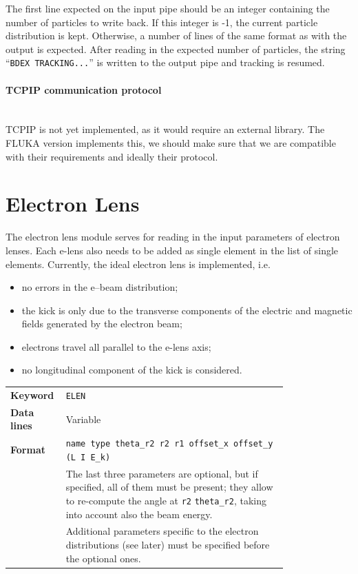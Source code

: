 The first line expected on the input pipe should be an integer containing the number of particles to write back.
If this integer is -1, the current particle distribution is kept.
Otherwise, a number of lines of the same format as with the output is expected.
After reading in the expected number of particles, the string ``\texttt{BDEX TRACKING...}'' is written to the output pipe and tracking is resumed.

\paragraph{TCPIP communication protocol}~\\

TCPIP is not yet implemented, as it would require an external library.
The FLUKA version implements this, we should make sure that we are compatible with their requirements and ideally their protocol.

\section{Electron Lens} \label{sec:elen}

The electron lens module serves for reading in the input parameters of electron lenses.
Each e-lens also needs to be added as single element in the list of single elements.
Currently, the ideal electron lens is implemented, i.e.
\begin{itemize}
\item no errors in the e--beam distribution;
\item the kick is only due to the transverse components of the electric and
  magnetic fields generated by the electron beam;
\item electrons travel all parallel to the e-lens axis;
\item no longitudinal component of the kick is considered.
\end{itemize}

\bigskip
\begin{tabular}{@{}lp{0.8\linewidth}}
    \textbf{Keyword}    & \texttt{ELEN}\index{ELEN} \\
    \textbf{Data lines} & Variable \\
    \textbf{Format}     & \texttt{name type theta\_r2 r2 r1 offset\_x offset\_y (L I E\_k) } \\
    & The last three parameters are optional, but if specified, all of them must be present; they allow to re-compute the angle at \texttt{r2} \texttt{theta\_r2}, taking into account also the beam energy.  \\
    & Additional parameters specific to the electron distributions (see later) must be specified before the optional ones. \\
\end{tabular}

